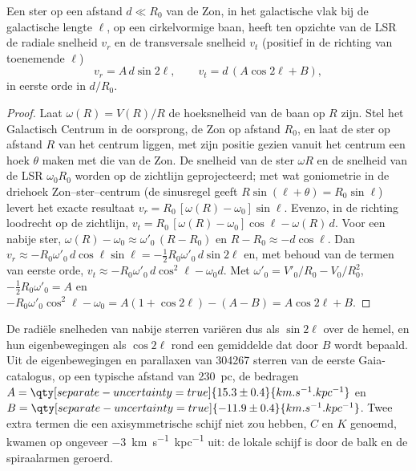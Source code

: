 \begin{theorem}\label{thm:b3:milky-way-galaxies:oort}
Een ster op een afstand $d \ll R_0$ van de Zon, in het galactische vlak bij
de galactische lengte $\ell$, op een cirkelvormige baan, heeft ten opzichte van de LSR de radiale
snelheid $v_r$ en de transversale snelheid $v_t$ (positief in de
richting van toenemende $\ell$)
\[
v_r = A\,d\sin 2\ell, \qquad v_t = d\,(A\cos 2\ell + B),
\]
in eerste orde in $d/R_0$.
\end{theorem}

\begin{proof}
Laat $\omega(R) = V(R)/R$ de hoeksnelheid van de baan op $R$ zijn. Stel
het Galactisch Centrum in de oorsprong, de Zon op afstand $R_0$, en laat de
ster op afstand $R$ van het centrum liggen, met zijn positie gezien vanuit het
centrum een hoek $\theta$ maken met die van de Zon.
De snelheid van de ster $\omega R$ en de snelheid van de LSR $\omega_0 R_0$ worden op de
zichtlijn geprojecteerd; met wat goniometrie in de driehoek Zon--ster--centrum (de sinusregel
geeft $R\sin(\ell + \theta) = R_0\sin\ell$) levert het exacte resultaat
$v_r = R_0\,[\omega(R) - \omega_0]\sin\ell$. Evenzo, in de richting
loodrecht op de zichtlijn,
$v_t = R_0\,[\omega(R) - \omega_0]\cos\ell - \omega(R)\,d$. Voor een nabije
ster, $\omega(R) - \omega_0 \approx \omega'_0\,(R - R_0)$ en
$R - R_0 \approx -d\cos\ell$. Dan
$v_r \approx -R_0\omega'_0\,d\cos\ell\sin\ell = -\tfrac12 R_0\omega'_0\,
d\sin 2\ell$ en, met behoud van de termen van eerste orde,
$v_t \approx -R_0\omega'_0\,d\cos^2\ell - \omega_0 d$. Met
$\omega'_0 = V'_0/R_0 - V_0/R_0^2$, $-\tfrac12 R_0\omega'_0 = A$ en
$-R_0\omega'_0\cos^2\ell - \omega_0 = A(1 + \cos 2\ell) - (A - B) =
A\cos 2\ell + B$.
\end{proof}

De radiële snelheden van nabije sterren variëren dus als $\sin 2\ell$ over
de hemel, en hun eigenbewegingen als $\cos 2\ell$ rond een gemiddelde dat door $B$ wordt bepaald.
Uit de eigenbewegingen en parallaxen van \num{304267} sterren van de eerste
Gaia-catalogus, op een typische afstand van \qty{230}{pc}, de 
bedragen $A = \qty[separate-uncertainty=true]{15.3 \pm 0.4}{km.s^{-1}.kpc^{-1}}$
en $B = \qty[separate-uncertainty=true]{-11.9 \pm 0.4}{km.s^{-1}.kpc^{-1}}$.
Twee extra termen die een axisymmetrische schijf niet zou hebben, $C$
en $K$ genoemd, kwamen op ongeveer \qty{-3}{km.s^{-1}.kpc^{-1}} uit: de lokale schijf is
door de balk en de spiraalarmen geroerd.

